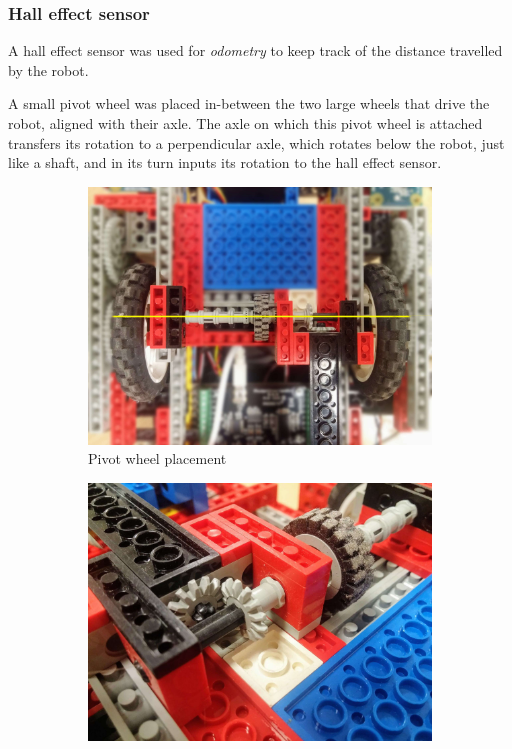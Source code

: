\subsubsection{Hall effect sensor}

A hall effect sensor was used for \textit{odometry} to keep track of the distance travelled by the robot.

A small pivot wheel was placed in-between the two large wheels that drive the robot, aligned with their axle. The axle on which this pivot wheel is attached transfers its rotation to a perpendicular axle, which rotates below the robot, just like a shaft, and in its turn inputs its rotation to the hall effect sensor.

\begin{figure}[ht]
    \centering
    \begin{subfigure}{0.32\textwidth}
        \includegraphics[width=\linewidth]{res/robot-pics/pivot-wheel-layout.jpg}
        \caption{Pivot wheel placement}
    \end{subfigure}
    \begin{subfigure}{0.32\textwidth}
        \includegraphics[width=\linewidth]{res/robot-pics/pivot-wheel-axel-transfer.jpg}

\end{subfigure}
\end{figure}
